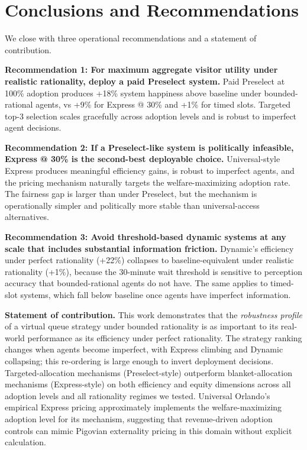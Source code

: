 \documentclass[11pt]{article}
\begin{document}
\section{Conclusions and Recommendations}

We close with three operational recommendations and a statement of contribution.

\textbf{Recommendation 1: For maximum aggregate visitor utility under realistic rationality, deploy a paid Preselect system.} Paid Preselect at 100\% adoption produces +18\% system happiness above baseline under bounded-rational agents, vs +9\% for Express @ 30\% and +1\% for timed slots. Targeted top-3 selection scales gracefully across adoption levels and is robust to imperfect agent decisions.

\textbf{Recommendation 2: If a Preselect-like system is politically infeasible, Express @ 30\% is the second-best deployable choice.} Universal-style Express produces meaningful efficiency gains, is robust to imperfect agents, and the pricing mechanism naturally targets the welfare-maximizing adoption rate. The fairness gap is larger than under Preselect, but the mechanism is operationally simpler and politically more stable than universal-access alternatives.

\textbf{Recommendation 3: Avoid threshold-based dynamic systems at any scale that includes substantial information friction.} Dynamic's efficiency under perfect rationality (+22\%) collapses to baseline-equivalent under realistic rationality (+1\%), because the 30-minute wait threshold is sensitive to perception accuracy that bounded-rational agents do not have. The same applies to timed-slot systems, which fall below baseline once agents have imperfect information.

\textbf{Statement of contribution.} This work demonstrates that the \emph{robustness profile} of a virtual queue strategy under bounded rationality is as important to its real-world performance as its efficiency under perfect rationality. The strategy ranking changes when agents become imperfect, with Express climbing and Dynamic collapsing; this re-ordering is large enough to invert deployment decisions. Targeted-allocation mechanisms (Preselect-style) outperform blanket-allocation mechanisms (Express-style) on both efficiency and equity dimensions across all adoption levels and all rationality regimes we tested. Universal Orlando's empirical Express pricing approximately implements the welfare-maximizing adoption level for its mechanism, suggesting that revenue-driven adoption controls can mimic Pigovian externality pricing in this domain without explicit calculation.
\end{document}
